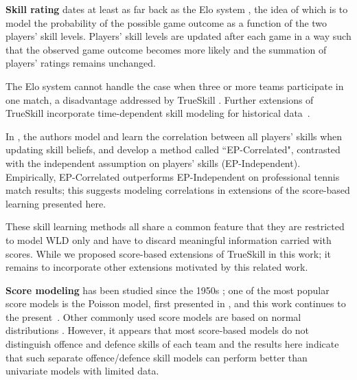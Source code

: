 {\bf Skill rating} dates at least as far back as the Elo system
\cite{elo78TheRatingOfChessPlayers}, the idea of which is to model the
probability of the possible game outcome as a function of the two
players' skill levels. Players' skill levels are updated after each
game in a way such that the observed game outcome becomes more likely
and the summation of players' ratings remains unchanged.

The Elo system cannot handle the case when three or more teams
participate in one match, a disadvantage addressed by TrueSkill
\cite{herbrich06569}. %
Further extensions of TrueSkill incorporate time-dependent
skill modeling for historical data~\cite{dangauthier07337}.


In \cite{birlutiu07ExpectationPropagation}, the authors model and learn the
correlation between all players' skills when updating skill beliefs, and
develop a method called ``EP-Correlated", contrasted with the
independent assumption on players' skills
(EP-Independent).  Empirically, EP-Correlated outperforms
EP-Independent on professional tennis match results;
this suggests modeling correlations in extensions of the
score-based learning presented here.

These skill learning methods all share a common feature that they are
restricted to model WLD only and have to discard meaningful
information carried with scores.  While we proposed score-based extensions
of TrueSkill in this work; it remains to incorporate other extensions
motivated by this related work.

{\bf Score modeling} has been studied since the 1950s
\cite{Moroney56FactsFromFigures}
\cite{dixon97ModellingAssociationFootball} \cite{Glickman98JASA}
\cite{Karlis03AnalysisOfSportsData}
\cite{karlis09BayesianModellingFootballOutcomes}; one of the most
popular score models is the Poisson model, first presented in
\cite{Moroney56FactsFromFigures}, and this work continues to the
present~\cite{karlis09BayesianModellingFootballOutcomes}. Other
commonly used score models are based on normal distributions
\cite{Glickman98JASA}. However, it appears that most score-based
models do not distinguish offence and defence skills of each team and
the results here indicate that such separate offence/defence skill
models can perform better than univariate models with limited data.